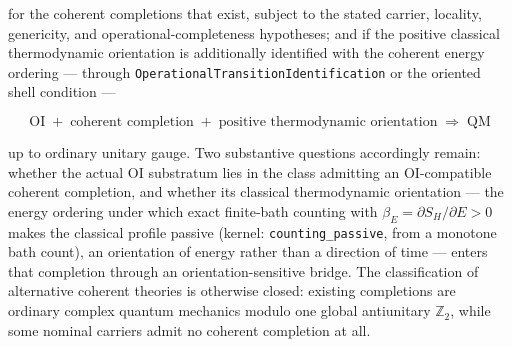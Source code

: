 \documentclass[
]{article}
\begin{document}
for the coherent completions that exist, subject to the stated carrier,
locality, genericity, and operational-completeness hypotheses; and if
the positive classical thermodynamic orientation is additionally
identified with the coherent energy ordering --- through
\texttt{OperationalTransitionIdentification} or the oriented shell
condition ---

\[\boxed{\;\mathrm{OI} \;+\; \text{coherent completion} \;+\; \text{positive thermodynamic orientation} \;\Longrightarrow\; \mathrm{QM}\;}\]

up to ordinary unitary gauge. Two substantive questions accordingly
remain: whether the actual OI substratum lies in the class admitting an
OI-compatible coherent completion, and whether its classical
thermodynamic orientation --- the energy ordering under which exact
finite-bath counting with \(\beta_E = \partial S_H/\partial E > 0\)
makes the classical profile passive (kernel: \texttt{counting\_passive},
from a monotone bath count), an orientation of energy rather than a
direction of time --- enters that completion through an
orientation-sensitive bridge. The classification of alternative coherent
theories is otherwise closed: existing completions are ordinary complex
quantum mechanics modulo one global antiunitary \(\mathbb{Z}_2\), while
some nominal carriers admit no coherent completion at all.
\end{document}
